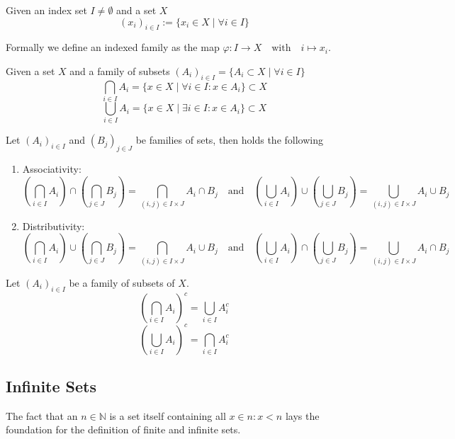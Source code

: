 \begin{definition}
   Given an index set \(I \neq \emptyset\) and a set \(X\)
   \[(x_i)_{i \in I} := \{x_i \in X \mid \forall i \in I\}\]
\end{definition}
\begin{remark}
   Formally we define an indexed family as the map \(\varphi: I \to X \quad\text{with}\quad i \mapsto x_i\).
\end{remark}
\begin{remark}
   Given a set \(X\) and a family of subsets \((A_i)_{i \in I} = \{A_i \subset X \mid \forall i \in I\}\)
   \[\bigcap_{i \in I} A_i = \{x \in X \mid \forall i \in I: x \in A_i\} \subset X\]
   \[\bigcup_{i \in I} A_i = \{x \in X \mid \exists i \in I: x \in A_i\} \subset X\]
\end{remark}

\begin{proposition}
   Let \((A_i)_{i \in I}\) and \((B_j)_{j \in J}\) be families of sets, then holds the following

   \begin{enumerate}[label=\roman*, align=Center]
      \item Associativity:
         \[\left(\bigcap_{i \in I} A_i\right) \cap \left(\bigcap_{j \in J} B_j\right) = \bigcap_{(i, j) \in I \times J} A_i \cap B_j \quad\text{and}\quad \left(\bigcup_{i \in I} A_i\right) \cup \left(\bigcup_{j \in J} B_j\right) = \bigcup_{(i, j) \in I \times J} A_i \cup B_j\]
      \item Distributivity:
         \[\left(\bigcap_{i \in I} A_i\right) \cup \left(\bigcap_{j \in J} B_j\right) = \bigcap_{(i, j) \in I \times J} A_i \cup B_j \quad\text{and}\quad \left(\bigcup_{i \in I} A_i\right) \cap \left(\bigcup_{j \in J} B_j\right) = \bigcup_{(i, j) \in I \times J} A_i \cap B_j\]
   \end{enumerate}
\end{proposition}

\begin{theorem}
   Let \((A_i)_{i \in I}\) be a family of subsets of \(X\).
   \begin{equation}\label{eq:de_morgan_fam_comp}
      \left(\bigcap_{i \in I} A_i \right)^c = \bigcup_{i \in I} A_i^c
   \end{equation}
   \[\left(\bigcup_{i \in I} A_i \right)^c = \bigcap_{i \in I} A_i^c\]
\end{theorem}

\subsection{Infinite Sets}
The fact that an \(n \in \mathbb{N}\) is a set itself containing all \(x \in n: x < n\) lays the foundation for the definition of finite and infinite sets.

